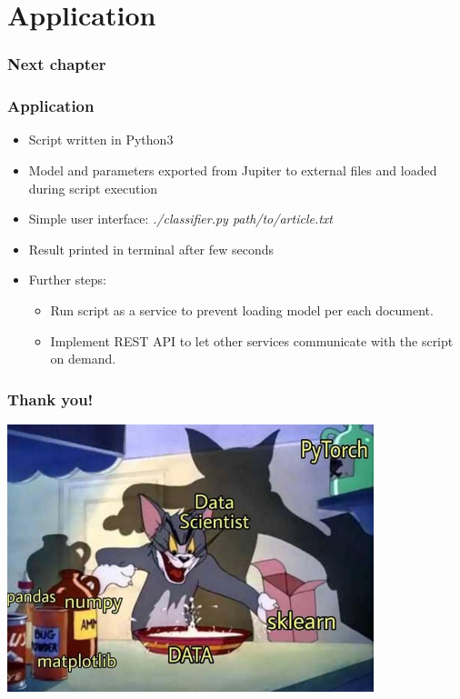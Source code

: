 \documentclass{beamer}
\begin{document}
    \section{Application}
    \begin{frame}
    	\frametitle{Next chapter}
        \tableofcontents[currentsection]
    \end{frame}
    \begin{frame}
    	\frametitle{Application}
        \begin{itemize}
            \item Script written in Python3
            \item Model and parameters exported from Jupiter to external files and loaded during script execution
            \item Simple user interface: \textit{./classifier.py path/to/article.txt}
            \item Result printed in terminal after few seconds
            \item Further steps: 
            \begin{itemize} 
                \item Run script as a service to prevent loading model per each document.
                \item Implement REST API to let other services communicate with the script on demand.
            \end{itemize}
        \end{itemize}
    \end{frame}
    \begin{frame}
    	\frametitle{Thank you!}
        \centering
   	    \includegraphics[width=0.8\textwidth]{dataScience.png}
    \end{frame}
\end{document}
